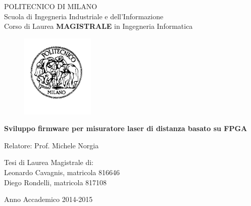 \thispagestyle{empty}
\vspace*{-1.5cm} \bfseries{
\begin{center}
  \large
  POLITECNICO DI MILANO\\
  \normalsize
  Scuola di Ingegneria Industriale e dell'Informazione\\
  Corso di Laurea \textbf{MAGISTRALE} in Ingegneria Informatica\\
  \begin{figure}[htbp]
    \begin{center}
      \includegraphics[width=3.5cm]{./pictures/logopm}
    \end{center}
  \end{figure}
  \vspace*{0.3cm} \LARGE



  \textbf{Sviluppo firmware per misuratore laser di distanza basato su FPGA}\\



  \vspace*{.75truecm} \large
\end{center}
\vspace*{3.0cm} \large
\begin{flushleft}


  Relatore: Prof. Michele Norgia

\end{flushleft}
\vspace*{1.0cm}
\begin{flushright}


  Tesi di Laurea Magistrale di:\\ Leonardo Cavagnis, matricola 816646 \\ 
		       Diego Rondelli, matricola 817108 \\


\end{flushright}
\vspace*{0.5cm}
\begin{center}



  Anno Accademico 2014-2015
\end{center} \clearpage
}
